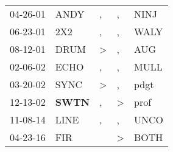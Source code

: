 \begin{supertabular}{p{0.07\textwidth}p{0.06\textwidth}p{0.02\textwidth}p{0.02\textwidth}p{0.06\textwidth}}
 04-26-01\textsuperscript{} &           ANDY\textsuperscript{} &             , &             , &  NINJ\textsuperscript{} \\
 06-23-01\textsuperscript{} &            2X2\textsuperscript{} &             , &             , &  WALY\textsuperscript{} \\
 08-12-01\textsuperscript{} &           DRUM\textsuperscript{} &  \textgreater &             , &   AUG\textsuperscript{} \\
 02-06-02\textsuperscript{} &           ECHO\textsuperscript{} &             , &             , &  MULL\textsuperscript{} \\
 03-20-02\textsuperscript{} &           SYNC\textsuperscript{} &  \textgreater &             , &  pdgt\textsuperscript{} \\
 12-13-02\textsuperscript{} &  \textbf{SWTN\textsuperscript{}} &             , &  \textgreater &  prof\textsuperscript{} \\
 11-08-14\textsuperscript{} &           LINE\textsuperscript{} &             , &             , &  UNCO\textsuperscript{} \\
 04-23-16\textsuperscript{} &            FIR\textsuperscript{} &               &  \textgreater &  BOTH\textsuperscript{} \\
\end{supertabular}
